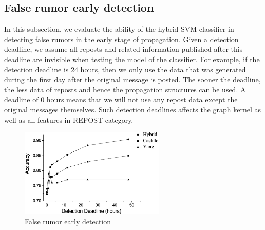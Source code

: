 \subsection{False rumor early detection}
In this subsection, we evaluate the ability of the hybrid
SVM classifier in detecting false rumors
in the early stage of propagation. Given a detection deadline,
we assume all reposts and related information published after
this deadline are invisible when testing the model of the classifier.
For example, if the detection deadline is 24 hours, then we only use the data
that was generated during the first day after the original message
is posted. The sooner the deadline, the less data of reposts and hence
the propagation structures can be used. A deadline of 0 hours
means that we will not use any repost data except the original messages
themselves. Such detection deadlines affects
the graph kernel as well as all features in REPOST category.

\begin{figure}[htb]
\centering
\includegraphics[height=120pt]{detect_origin.eps}
\caption{False rumor early detection}
\label{fig:early_detection}
\end{figure}

